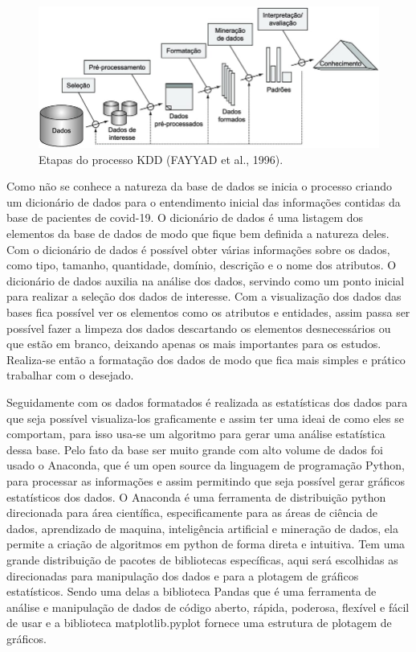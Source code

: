 \documentclass[tcc1]{uftex}
\begin{document}
    \begin{figure}[h]

    \centering
    \includegraphics[width=12cm]{kdd.jpg} %
    \caption{Etapas do processo KDD (FAYYAD et al., 1996).}
    \end{figure}


Como não se conhece a natureza da base de dados se inicia o processo criando um dicionário de dados para o entendimento inicial das informações contidas da base de pacientes de covid-19.  O dicionário de dados é uma listagem dos elementos da base de dados de modo que fique bem definida a natureza deles. Com o dicionário de dados é possível obter várias informações sobre os dados, como tipo, tamanho, quantidade, domínio, descrição e o nome dos atributos. O dicionário de dados auxilia na análise dos dados, servindo como um ponto inicial para realizar a seleção dos dados de interesse. Com a visualização dos dados das bases fica possível ver os elementos como os atributos e entidades, assim passa ser possível fazer a limpeza dos dados descartando os elementos desnecessários ou que estão em branco, deixando apenas os mais importantes para os estudos. Realiza-se então a formatação dos dados de modo que fica mais simples e prático trabalhar com o desejado.
	
	
	Seguidamente com os dados formatados é realizada as estatísticas dos dados para que seja possível visualiza-los graficamente e assim ter uma ideai de como eles se comportam, para isso usa-se um algoritmo para gerar uma análise estatística dessa base. Pelo fato da base ser muito grande com alto volume de dados foi usado o Anaconda, que é um open source da linguagem de programação Python, para processar as informações e assim permitindo que seja possível gerar gráficos estatísticos dos dados. O Anaconda é uma ferramenta de distribuição python direcionada para área científica, especificamente para as áreas de ciência de dados, aprendizado de maquina, inteligência artificial e mineração de dados, ela permite a criação de algoritmos em python de forma direta e intuitiva. Tem uma grande distribuição de pacotes de bibliotecas específicas, aqui será escolhidas as direcionadas para manipulação dos dados e para a plotagem de gráficos estatísticos. Sendo uma delas a biblioteca Pandas que é uma ferramenta de análise e manipulação de dados de código aberto, rápida, poderosa, flexível e fácil de usar e a biblioteca matplotlib.pyplot fornece uma estrutura de plotagem de gráficos.
	
\end{document}
